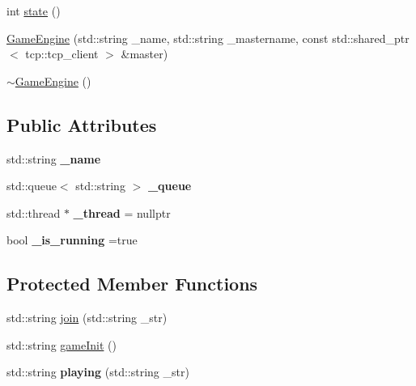 \begin{DoxyCompactItemize}
\item 
int \hyperlink{classGameEngine_a2efeb330b4e8c23aaeaf9928ae068301}{state} ()
\item 
\hyperlink{classGameEngine_a7ef964f05589c5440d7d06ad3aa3ee16}{Game\+Engine} (std\+::string \+\_\+name, std\+::string \+\_\+mastername, const std\+::shared\+\_\+ptr$<$ tcp\+::tcp\+\_\+client $>$ \&master)
\item 
\hyperlink{classGameEngine_a8e59d8341ef9d2dcc62eee1437e37f14}{$\sim$\+Game\+Engine} ()
\end{DoxyCompactItemize}
\subsection*{Public Attributes}
\begin{DoxyCompactItemize}
\item 
std\+::string {\bfseries \+\_\+name}\hypertarget{classGameEngine_ad405ac36f2e3560b693e1d417a240df3}{}\label{classGameEngine_ad405ac36f2e3560b693e1d417a240df3}

\item 
std\+::queue$<$ std\+::string $>$ {\bfseries \+\_\+queue}\hypertarget{classGameEngine_abff9f93c1407c61f310dccc2f4da6e83}{}\label{classGameEngine_abff9f93c1407c61f310dccc2f4da6e83}

\item 
std\+::thread $\ast$ {\bfseries \+\_\+thread} = nullptr\hypertarget{classGameEngine_aaf3a9ff9ff49b63d0ab1713ee5e24cfe}{}\label{classGameEngine_aaf3a9ff9ff49b63d0ab1713ee5e24cfe}

\item 
bool {\bfseries \+\_\+is\+\_\+running} =true\hypertarget{classGameEngine_abc77225c528e453428f41b44c868a2e0}{}\label{classGameEngine_abc77225c528e453428f41b44c868a2e0}

\end{DoxyCompactItemize}
\subsection*{Protected Member Functions}
\begin{DoxyCompactItemize}
\item 
std\+::string \hyperlink{classGameEngine_aa9493de5dbf8e1c08451052820333858}{join} (std\+::string \+\_\+str)
\item 
std\+::string \hyperlink{classGameEngine_a65d1f7b9fac5c0e6f52eadfaed7da4e7}{game\+Init} ()
\item 
std\+::string {\bfseries playing} (std\+::string \+\_\+str)\hypertarget{classGameEngine_ab48f3a94eabf908c8daed33b07d97b56}{}\label{classGameEngine_ab48f3a94eabf908c8daed33b07d97b56}

\end{DoxyCompactItemize}


